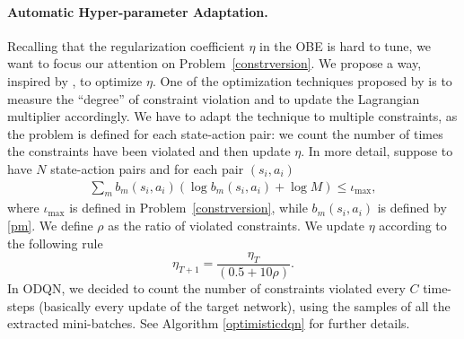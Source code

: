 \paragraph{Automatic Hyper-parameter Adaptation.}
\label{subsec:adaptive}
Recalling that the regularization coefficient $\eta$ in the OBE is hard to tune, we want to focus our attention on Problem~\ref{constrversion}. We propose a way, inspired by \cite{schulman2017proximal}, to optimize $\eta$.
One of the optimization techniques proposed by \citeauthor{schulman2017proximal} is to measure the ``degree'' of constraint violation and to update the Lagrangian multiplier accordingly. We have to adapt the technique to multiple constraints, as the problem is defined for each state-action pair: we count the number of times the constraints have been violated and then update $\eta$. In more detail, suppose to have $N$ state-action pairs and for each pair $(s_i, a_i)$
\begin{eqnarray}
\sum_m b_m(s_i,a_i) (\log b_m(s_i,a_i) + \log M) \leq \iota_{\max}, \label{batchconstr}
\end{eqnarray}
where $\iota_{\max}$ is defined in Problem~\ref{constrversion}, while $b_m(s_i,a_i)$ is defined by \eqref{pm}. We define $\rho$ as the ratio of violated constraints. We update $\eta$ according to the following rule
\begin{equation}
\eta_{T+1} = \frac{\eta_{T}}{(0.5 +  10 \rho)} \label{etaupdate}.
\end{equation}
In ODQN, we decided to count the number of constraints violated every $C$ time-steps (basically every update of the target network), using the samples of all the extracted mini-batches. See Algorithm \ref{optimisticdqn} for further details.

  
